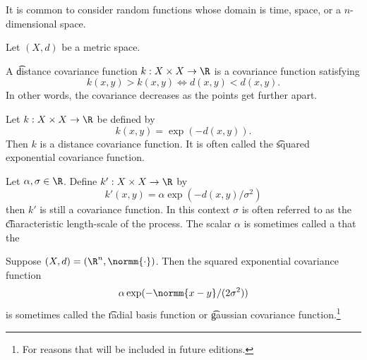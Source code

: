 

It is common to consider random functions whose domain is time, space, or a $n$-dimensional space.


Let $(X, d)$ be a metric space.

A \t{distance covariance function} $k: X \times X \to \R$ is a covariance function satisfying
\[
  k(x, y) > k(x, y) \iff d(x, y) < d(x, y).
\]
In other words, the covariance decreases as the points get further apart.


Let $k: X \times X \to \R$ be defined by
\[
  k(x, y) = \exp(-d(x, y)).
\]
Then $k$ is a distance covariance function.
It is often called the \t{squared exponential covariance function}.

Let $\alpha, \sigma \in \R$.
Define $k': X \times X \to \R$ by
\[
  k'(x, y) = \alpha\exp(-d(x, y)/\sigma^2)
\]
then $k'$ is still a covariance function.
In this context $\sigma$ is often referred to as the \t{characteristic length-scale} of the process.
The scalar $\alpha$ is sometimes called a  that  the 

Suppose $(X, d) = (\R^n, \normm{\cdot})$.
Then the squared exponential covariance function
\[
 \alpha\exp(-\normm{x - y}/(2\sigma^2))
\]
is sometimes called the \t{radial basis function} or \t{gaussian covariance function}.\footnote{For reasons that will be included in future editions.}
